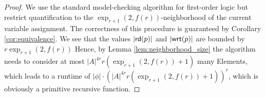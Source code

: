 \begin{appendix}
	\decidable*
	\begin{proof}
		We use the standard model-checking algorithm for first-order logic but restrict quantification to the $\exp_{r+1}(2,f(r))$-neighborhood of the current variable assignment. The correctness of this procedure is guaranteed by Corollary \ref{cor:equivalence}.
		We see that the values $|\mathsf{rd}(p)|$ and $|\mathsf{wrt}(p)|$ are bounded by $r\exp_{r+1}(2,f(r))$
		Hence, by Lemma \ref{lem:neighborhood_size} the algorithm needs to consider at most $|A|^{4r} r(\exp_{r+1}(2,f(r)) +1)$ many Elements, which leads to a runtime of
		$|\phi| \cdot (|A|^{4r} r(\exp_{r+1}(2,f(r)) +1))^r$, which is obviously a primitive recursive function. 
	\end{proof}
\end{appendix}
